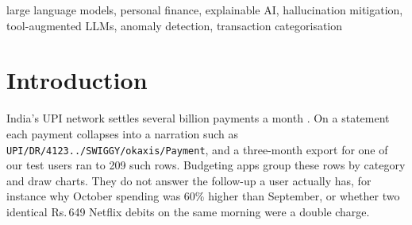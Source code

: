 \documentclass[conference]{IEEEtran}
\DeclareRobustCommand{\rupee}{Rs.\,}
\begin{document}
\begin{abstract}
Bank statements list debits and credits but do not explain them, and a general-purpose large language model (LLM) given a raw statement tends to report totals that are not in the data. FinWise is a statement explainer for Indian bank exports (CSV, XLSX and PDF) in which numbers are produced only by deterministic code. The LLM is used for three narrow tasks: labelling merchants missing from an 86-pattern rule list, mapping a question to one of eleven typed analytics functions (\emph{Text-to-Analytics}), and wording the returned result. A \emph{Numeric Claim Verifier} parses every amount, percentage and ratio in the generated text and matches it against the computed values; the matched fraction is reported as the \emph{Grounded Faithfulness Score} (GFS). On 535 labelled transactions from three synthetic personas, the cache, rules and LLM categoriser scored 97.2\% accuracy (95\% CI 95.4--98.3\%) against 64.3\% for rules and 93.3\% for LLM-only labelling, using 6,832 instead of 13,319 tokens. A robust z-score detector with three domain rules recovered 15 of 15 planted anomalies (z-score baselines: at most 6). On 30 benchmark questions, Text-to-Analytics answered 90\% correctly against 25\% for prompting with the full statement (Fisher $p=3.6\times10^{-6}$), at about 1.25k instead of 6.3k tokens per question, and one verifier-triggered rewrite lifted numeric claim precision from 96.8\% to 100\%.
\end{abstract}

\begin{IEEEkeywords}
large language models, personal finance, explainable AI, hallucination mitigation, tool-augmented LLMs, anomaly detection, transaction categorisation
\end{IEEEkeywords}

\section{Introduction}
India's UPI network settles several billion payments a month \cite{npci}. On a statement each payment collapses into a narration such as \texttt{UPI/DR/4123../SWIGGY/okaxis/Payment}, and a three-month export for one of our test users ran to 209 such rows. Budgeting apps group these rows by category and draw charts. They do not answer the follow-up a user actually has, for instance why October spending was 60\% higher than September, or whether two identical \rupee 649 Netflix debits on the same morning were a double charge.
\end{document}
